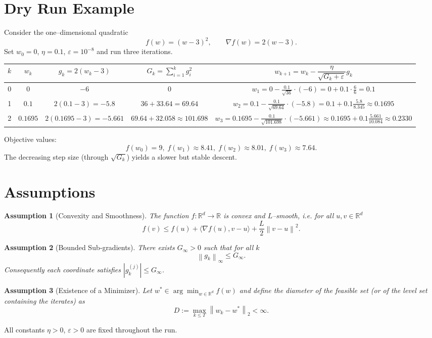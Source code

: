 \documentclass{article}
\newtheorem{assumption}{Assumption}
\newcommand{\R}{\mathbb{R}}
\newcommand{\norm}[1]{\left\lVert #1 \right\rVert}
\newcommand{\ip}[2]{\langle #1,#2\rangle}
\begin{document}
\section*{Dry Run Example}
Consider the one–dimensional quadratic 
\[
f(w)=(w-3)^{2},\qquad \nabla f(w)=2(w-3).
\]
Set $w_{0}=0$, $\eta=0.1$, $\varepsilon=10^{-8}$ and run three iterations.

\begin{center}
\begin{tabular}{c|c|c|c|c}
$k$ & $w_{k}$ & $g_{k}=2(w_{k}-3)$ & $G_{k}=\sum_{i=1}^{k}g_{i}^{2}$ & $w_{k+1}=w_{k}-\dfrac{\eta}{\sqrt{G_{k}+\varepsilon}}g_{k}$ \\
\hline
0 & $0$ & $-6$ & $0$ & $w_{1}=0-\frac{0.1}{\sqrt{36}}\cdot(-6)=0+0.1\cdot\frac{6}{6}=0.1$\\[4pt]
1 & $0.1$ & $2(0.1-3)=-5.8$ & $36+33.64=69.64$ &
$w_{2}=0.1-\frac{0.1}{\sqrt{69.64}}\cdot(-5.8)
      =0.1+0.1\frac{5.8}{8.345}\approx0.1695$\\[4pt]
2 & $0.1695$ & $2(0.1695-3)=-5.661$ &
$69.64+32.058\approx101.698$ &
$w_{3}=0.1695-\frac{0.1}{\sqrt{101.698}}\cdot(-5.661)
      \approx0.1695+0.1\frac{5.661}{10.084}\approx0.2330$\\
\end{tabular}
\end{center}
Objective values:
\[
f(w_{0})=9,\; f(w_{1})\approx8.41,\; f(w_{2})\approx8.01,\;
f(w_{3})\approx7.64.
\]
The decreasing step size (through $\sqrt{G_{k}}$) yields a slower but
stable descent.

\section*{Assumptions}
\begin{assumption}[Convexity and Smoothness]\label{ass:convex}
The function $f:\R^{d}\rightarrow\R$ is convex and $L$–smooth, i.e. for all
$u,v\in\R^{d}$
\[
f(v)\le f(u)+\ip{\nabla f(u)}{v-u}+\frac{L}{2}\norm{v-u}^{2}.
\tag{3}
\]
\end{assumption}
\begin{assumption}[Bounded Sub‑gradients]\label{ass:bounded}
There exists $G_{\infty}>0$ such that for all $k$
\[
\norm{g_{k}}_{\infty}\le G_{\infty}.
\tag{4}
\]
Consequently each coordinate satisfies $|g_{k}^{(j)}|\le G_{\infty}$.
\end{assumption}
\begin{assumption}[Existence of a Minimizer]\label{ass:opt}
Let $w^{\ast}\in\arg\min_{w\in\R^{d}} f(w)$ and define the diameter of the
feasible set (or of the level set containing the iterates) as
\[
D:=\max_{k\le T}\norm{w_{k}-w^{\ast}}_{2}<\infty .
\tag{5}
\]
\end{assumption}
All constants $\eta>0$, $\varepsilon>0$ are fixed throughout the run.
\end{document}
